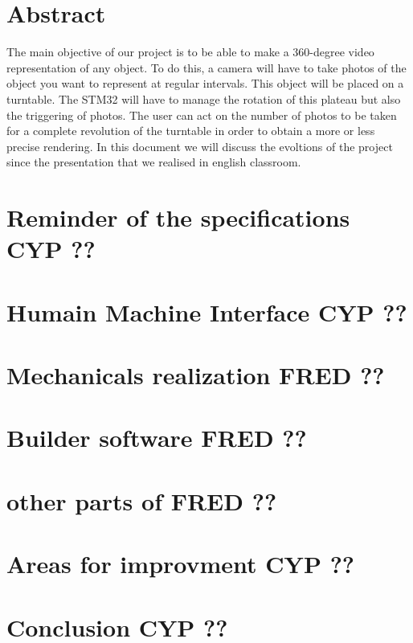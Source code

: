 \section{Abstract}

The main objective of our project is to be able to make a 360-degree video representation of any object. To do this, a camera will have to take photos of the object you want to represent at regular intervals. This object will be placed on a turntable. The STM32 will have to manage the rotation of this plateau but also the triggering of photos. The user can act on the number of photos to be taken for a complete revolution of the turntable in order to obtain a more or less precise rendering. 
\newline
In this document we will discuss the evoltions of the project since the presentation that we realised in english classroom. 


\section {Reminder of the specifications   CYP ??} 

\section{Humain Machine Interface   CYP ??}

\section {Mechanicals realization  FRED ??  } 


\section {Builder software  FRED ??  } 

\section {other parts of  FRED ??  } 

\section {Areas for improvment  CYP ??} 

\section {Conclusion  CYP ?? } 
